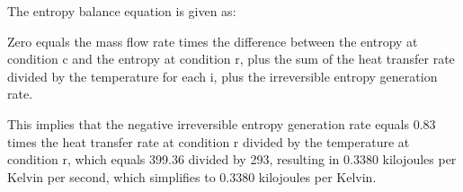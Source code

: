 The entropy balance equation is given as:

Zero equals the mass flow rate times the difference between the entropy at condition c and the entropy at condition r, plus the sum of the heat transfer rate divided by the temperature for each i, plus the irreversible entropy generation rate.

This implies that the negative irreversible entropy generation rate equals 0.83 times the heat transfer rate at condition r divided by the temperature at condition r, which equals 399.36 divided by 293, resulting in 0.3380 kilojoules per Kelvin per second, which simplifies to 0.3380 kilojoules per Kelvin.